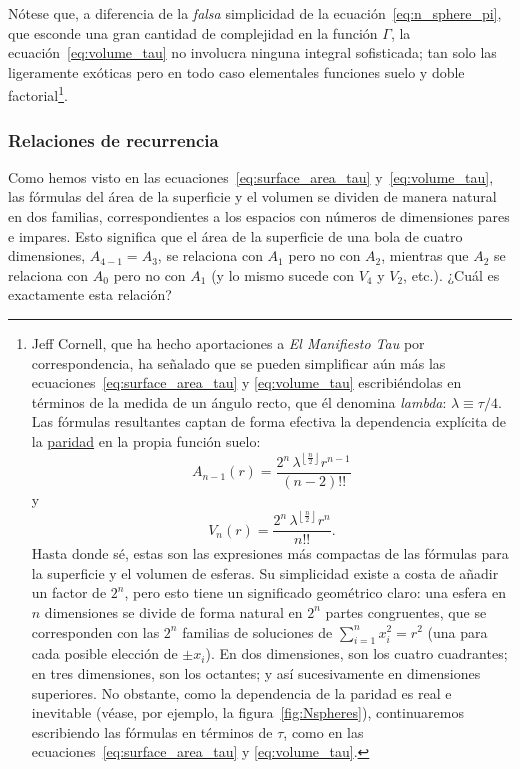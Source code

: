 Nótese que, a diferencia de la \emph{falsa} simplicidad de la ecuación~\eqref{eq:n_sphere_pi}, que esconde una gran cantidad de complejidad en la función $\Gamma$, la ecuación~\eqref{eq:volume_tau} no involucra ninguna integral sofisticada; tan solo las ligeramente exóticas pero en todo caso elementales funciones suelo y doble factorial\footnote{Jeff Cornell, que ha hecho aportaciones a \emph{El Manifiesto Tau} por correspondencia, ha señalado que se pueden simplificar aún más las ecuaciones~\eqref{eq:surface_area_tau} y \eqref{eq:volume_tau} escribiéndolas en términos de la medida de un ángulo recto, que él denomina \emph{lambda}: $\lambda \equiv \tau/4$. Las fórmulas resultantes captan de forma efectiva la dependencia explícita de la \href{https://es.wikipedia.org/wiki/N%C3%BAmeros_pares_e_impares}{paridad} en la propia función suelo: 
\[
A_{n-1}(r) = \frac{2^n\,\lambda^{\left\lfloor \frac{n}{2} \right\rfloor} r^{n-1}}{(n-2)!!}
\]
y 
\[
V_n(r) = \frac{2^n\,\lambda^{\left\lfloor \frac{n}{2} \right\rfloor} r^n}{n!!}.
\]
Hasta donde sé, estas son las expresiones más compactas de las fórmulas para la superficie y el volumen de esferas. Su simplicidad existe a costa de añadir un factor de $2^n$, pero esto tiene un significado geométrico claro: una esfera en $n$ dimensiones se divide de forma natural en $2^n$ partes congruentes, que se corresponden con las $2^n$ familias de soluciones de $\sum_{i=1}^{n} x_i^2 = r^2$ (una para cada posible elección de $\pm x_i$). En dos dimensiones, son los cuatro cuadrantes; en tres dimensiones, son los octantes; y así sucesivamente en dimensiones superiores. No obstante, como la dependencia de la paridad es real e inevitable (véase, por ejemplo, la figura~\ref{fig:Nspheres}), continuaremos escribiendo las fórmulas en términos de $\tau$, como en las ecuaciones~\eqref{eq:surface_area_tau} y \eqref{eq:volume_tau}.}.


\subsubsection{Relaciones de recurrencia} %
\label{sec:recurrences}

Como hemos visto en las ecuaciones~\eqref{eq:surface_area_tau} y~\eqref{eq:volume_tau}, las fórmulas del área de la superficie y el volumen se dividen de manera natural en dos familias, correspondientes a los espacios con números de dimensiones pares e impares. Esto significa que el área de la superficie de una bola de cuatro dimensiones, $A_{4-1} = A_3$, se relaciona con $A_1$ pero no con $A_2$, mientras que $A_2$ se relaciona con $A_0$ pero no con $A_1$ (y lo mismo sucede con $V_4$ y $V_2$, etc.). ¿Cuál es exactamente esta relación?

